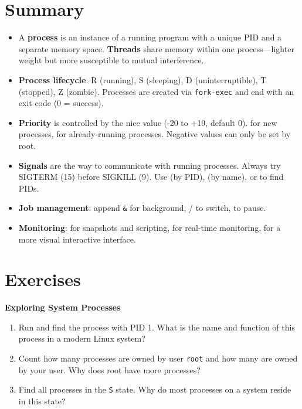 \section{Summary}
\label{sec:process-summary}

\begin{itemize}
  \item A \textbf{process} is an instance of a running program with a unique
    PID and a separate memory space. \textbf{Threads} share memory within one
    process---lighter weight but more susceptible to mutual interference.
  \item \textbf{Process lifecycle}: R (running), S (sleeping), D (uninterruptible),
    T (stopped), Z (zombie). Processes are created via \texttt{fork-exec} and
    end with an exit code (0 = success).
  \item \textbf{Priority} is controlled by the nice value (-20 to +19, default 0).
     for new processes,  for already-running processes.
    Negative values can only be set by root.
  \item \textbf{Signals} are the way to communicate with running processes.
    Always try SIGTERM (15) before SIGKILL (9). Use  (by PID),
     (by name), or  to find PIDs.
  \item \textbf{Job management}: append \texttt{\&} for background, /
    to switch,  to pause.
  \item \textbf{Monitoring}:  for snapshots and scripting,  for
    real-time monitoring,  for a more visual interactive interface.
\end{itemize}

\section{Exercises}
\label{sec:process-exercises}

\begin{exercisebox}[6.A]
  \textbf{Exploring System Processes}
  \begin{enumerate}
    \item Run  and find the process with PID 1. What is
      the name and function of this process in a modern Linux system?
    \item Count how many processes are owned by user \texttt{root} and how
      many are owned by your user. Why does root have more processes?
    \item Find all processes in the \texttt{S} state. Why do most processes
      on a system reside in this state?
  \end{enumerate}
\end{exercisebox}

